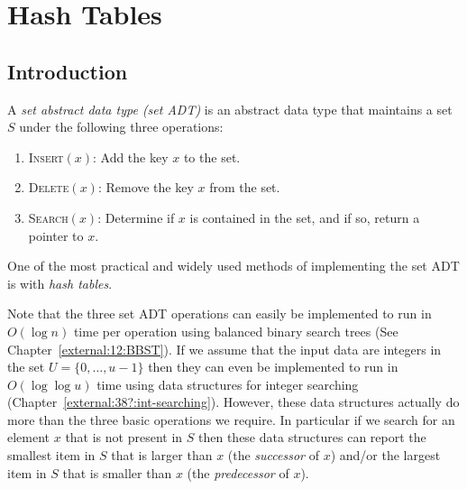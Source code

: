 \chapter{Hash Tables}

\newcommand{\E}{\mathrm{E}}
\newcommand{\floor}[1]{\lfloor #1 \rfloor}
\newcommand{\ceil}[1]{\lceil #1 \rceil}

\newcommand{\etal}{et al.}

\begin{chapterauthors}
\end{chapterauthors}


\section{Introduction}

A \emph{set abstract data type (set ADT)} is an
abstract data type that maintains a set $S$ under the following three
operations:

\begin{enumerate}

\item \textsc{Insert}$(x)$:  Add the key $x$ to the set.

\item \textsc{Delete}$(x)$: Remove the key $x$ from the set.

\item \textsc{Search}$(x)$: Determine if $x$ is contained in the set,
and if so, return a pointer to $x$. 

\end{enumerate}
One of the most practical and widely used methods of implementing the
set ADT is with \emph{hash tables}.  

Note that the three set ADT operations can easily be implemented to
run in $O(\log n)$ time per operation using balanced binary search
trees (See Chapter~\ref{external:12:BBST}).  If we assume that the
input data are integers in the set $U=\{0,\ldots,u-1\}$ then they can
even be implemented to run in $O(\log\log u)$ time using data
structures for integer searching
(Chapter~\ref{external:38?:int-searching}).  However, these data
structures actually do more than the three basic operations we
require.  In particular if we search for an element $x$ that is not
present in $S$ then these data structures can report the smallest item
in $S$ that is larger than $x$ (the \emph{successor} of $x$) and/or
the largest item in $S$ that is smaller than $x$ (the
\emph{predecessor} of $x$).  

